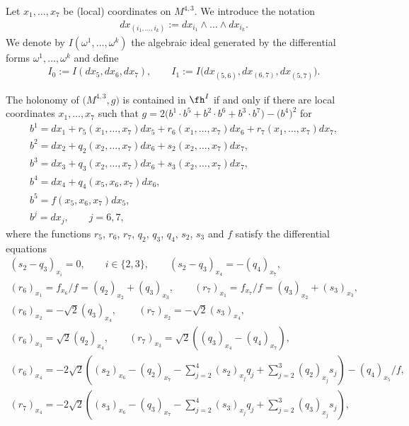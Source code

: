 \begin{Definition}Let $x_1,\dots, x_7$ be (local) coordinates on $M^{4,3}$. We introduce the notation \begin{gather*}dx_{(i_1,\dots,i_k)}:=dx_{i_1}\wedge \dots \wedge dx_{i_k}.\end{gather*}
We denote by $I(\omega^1,\dots, \omega^k)$ the algebraic ideal generated by the differential forms $\omega^1,\dots, \omega^k$ and define \begin{gather*}I_0:=I(dx_5,dx_6,dx_7),\qquad I_1:=I\big(dx_{(5,6)}, dx_{(6,7)}, dx_{(5,7)}\big).\end{gather*}
\end{Definition}

\begin{Proposition}\label{Lg}The holonomy of $\big(M^{4,3},g\big)$ is contained in $\fh^I$ if and only if there are local coordinates $x_1,\dots,x_7$ such that $g=2\big(b^1\cdot b^5+b^2\cdot b^6+b^3\cdot b^7\big)- \big(b^4\big)^2$ for
\begin{gather}
b^1 = dx_1+r_5(x_1,\dots,x_7)dx_5+r_6(x_1,\dots,x_7)dx_6+r_7(x_1,\dots,x_7)dx_7,\label{beg}\\
b^2 =dx_2+ q_2(x_2,\dots,x_7)dx_6+s_2(x_2,\dots,x_7)dx_7,\\
b^3 =dx_3+ q_3(x_2,\dots,x_7)dx_6+s_3(x_2,\dots,x_7)dx_7,\\
b^4 =dx_4+ q_4(x_5,x_6,x_7)dx_6,\\
b^5 =f(x_5,x_6,x_7)dx_5,\\
b^j =dx_j,\qquad j=6,7, \label{end}
\end{gather}
 where the functions $r_5$, $r_6$, $r_7$, $q_2$, $q_3$, $q_4$, $s_2$, $s_3$ and $f$ satisfy the differential equations
\begin{gather}
(s_2-q_3)_{x_i}=0,\qquad i\in\{2,3\},\qquad (s_2-q_3)_{x_4}=-(q_4)_{x_7},\label{Eb1}\\
(r_6)_{x_1}=f_{x_6}/f=(q_2)_{x_2}+(q_3)_{x_3}, \qquad (r_7)_{x_1}=f_{x_7}/f=(q_3)_{x_2}+(s_3)_{x_3},\label{Eb2}\\
(r_6)_{x_2}=-\sqrt{2} (q_3)_{x_4},\qquad \, (r_7)_{x_2}=-\sqrt{2} (s_3)_{x_4},\label{Eb3}\\
(r_6)_{x_3}=\sqrt{2} (q_2)_{x_4},\qquad (r_7)_{x_3}=\sqrt{2} ((q_3)_{x_4}-(q_4)_{x_7}),\label{Eb4}\\
(r_6)_{x_4}= -2\sqrt{2}\left((s_2)_{x_6}-(q_2)_{x_7}-\sum_{j=2}^4(s_2)_{x_j}q_j+\sum_{j=2}^3(q_2)_{x_j}s_j\right)-(q_4)_{x_5}/f ,\label{Eb4a}\\
(r_7)_{x_4}= -2\sqrt{2}\left((s_3)_{x_6}-(q_3)_{x_7}-\sum_{j=2}^4(s_3)_{x_j}q_j+\sum_{j=2}^3(q_3)_{x_j}s_j\right) ,\label{Eb5}\\

\end{gather}
\end{Proposition}
